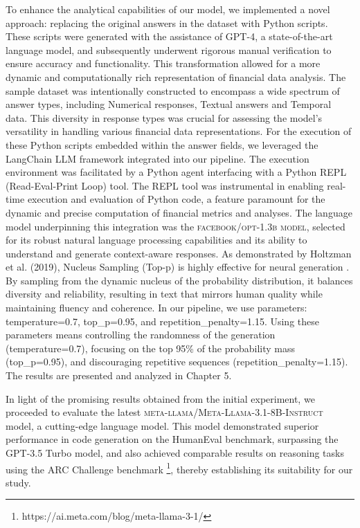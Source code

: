\documentclass[logo,msc]{infthesis}           %
\begin{document}
To enhance the analytical capabilities of our model, we implemented a novel approach: replacing the original answers in the dataset with Python scripts. These scripts were generated with the assistance of GPT-4, a state-of-the-art language model, and subsequently underwent rigorous manual verification to ensure accuracy and functionality. This transformation allowed for a more dynamic and computationally rich representation of financial data analysis. The sample dataset was intentionally constructed to encompass a wide spectrum of answer types, including Numerical responses, Textual answers and Temporal data. This diversity in response types was crucial for assessing the model's versatility in handling various financial data representations. For the execution of these Python scripts embedded within the answer fields, we leveraged the LangChain LLM framework integrated into our pipeline. The execution environment was facilitated by a Python agent interfacing with a Python REPL (Read-Eval-Print Loop) tool. The REPL tool was instrumental in enabling real-time execution and evaluation of Python code, a feature paramount for the dynamic and precise computation of financial metrics and analyses. The language model underpinning this integration was the \textsc{facebook/opt-1.3b model}, selected for its robust natural language processing capabilities and its ability to understand and generate context-aware responses. 
As demonstrated by Holtzman et al. (2019), Nucleus Sampling (Top-p) is highly effective for neural generation \cite{holtzman2019curious}. By sampling from the dynamic nucleus of the probability distribution, it balances diversity and reliability, resulting in text that mirrors human quality while maintaining fluency and coherence. In our pipeline, we use parameters: temperature=0.7, top\_p=0.95, and repetition\_penalty=1.15. Using these parameters means controlling the randomness of the generation (temperature=0.7), focusing on the top 95\% of the probability mass (top\_p=0.95), and discouraging repetitive sequences (repetition\_penalty=1.15). The results are presented and analyzed in Chapter 5.

In light of the promising results obtained from the initial experiment, we proceeded to evaluate the latest \textsc{meta-llama/Meta-Llama-3.1-8B-Instruct} model, a cutting-edge language model. This model demonstrated superior performance in code generation on the HumanEval benchmark, surpassing the GPT-3.5 Turbo model, and also achieved comparable results on reasoning tasks using the ARC Challenge benchmark \footnote{https://ai.meta.com/blog/meta-llama-3-1/}, thereby establishing its suitability for our study.
\end{document}
